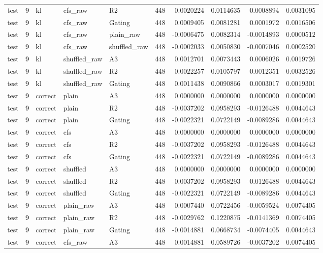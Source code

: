 \begin{tabular}{lrlllrrrrr}
test & 9 & kl & cfs_raw & R2 & 448 & 0.0020224 & 0.0114635 & 0.0008894 & 0.0031095 \\
test & 9 & kl & cfs_raw & Gating & 448 & 0.0009405 & 0.0081281 & 0.0001972 & 0.0016506 \\
test & 9 & kl & cfs_raw & plain_raw & 448 & -0.0006475 & 0.0082314 & -0.0014893 & 0.0000512 \\
test & 9 & kl & cfs_raw & shuffled_raw & 448 & -0.0002033 & 0.0050830 & -0.0007046 & 0.0002520 \\
test & 9 & kl & shuffled_raw & A3 & 448 & 0.0012701 & 0.0073443 & 0.0006026 & 0.0019726 \\
test & 9 & kl & shuffled_raw & R2 & 448 & 0.0022257 & 0.0105797 & 0.0012351 & 0.0032526 \\
test & 9 & kl & shuffled_raw & Gating & 448 & 0.0011438 & 0.0090866 & 0.0003017 & 0.0019301 \\
test & 9 & correct & plain & A3 & 448 & 0.0000000 & 0.0000000 & 0.0000000 & 0.0000000 \\
test & 9 & correct & plain & R2 & 448 & -0.0037202 & 0.0958293 & -0.0126488 & 0.0044643 \\
test & 9 & correct & plain & Gating & 448 & -0.0022321 & 0.0722149 & -0.0089286 & 0.0044643 \\
test & 9 & correct & cfs & A3 & 448 & 0.0000000 & 0.0000000 & 0.0000000 & 0.0000000 \\
test & 9 & correct & cfs & R2 & 448 & -0.0037202 & 0.0958293 & -0.0126488 & 0.0044643 \\
test & 9 & correct & cfs & Gating & 448 & -0.0022321 & 0.0722149 & -0.0089286 & 0.0044643 \\
test & 9 & correct & shuffled & A3 & 448 & 0.0000000 & 0.0000000 & 0.0000000 & 0.0000000 \\
test & 9 & correct & shuffled & R2 & 448 & -0.0037202 & 0.0958293 & -0.0126488 & 0.0044643 \\
test & 9 & correct & shuffled & Gating & 448 & -0.0022321 & 0.0722149 & -0.0089286 & 0.0044643 \\
test & 9 & correct & plain_raw & A3 & 448 & 0.0007440 & 0.0722456 & -0.0059524 & 0.0074405 \\
test & 9 & correct & plain_raw & R2 & 448 & -0.0029762 & 0.1220875 & -0.0141369 & 0.0074405 \\
test & 9 & correct & plain_raw & Gating & 448 & -0.0014881 & 0.0668734 & -0.0074405 & 0.0044643 \\
test & 9 & correct & cfs_raw & A3 & 448 & 0.0014881 & 0.0589726 & -0.0037202 & 0.0074405 \\

\end{tabular}
